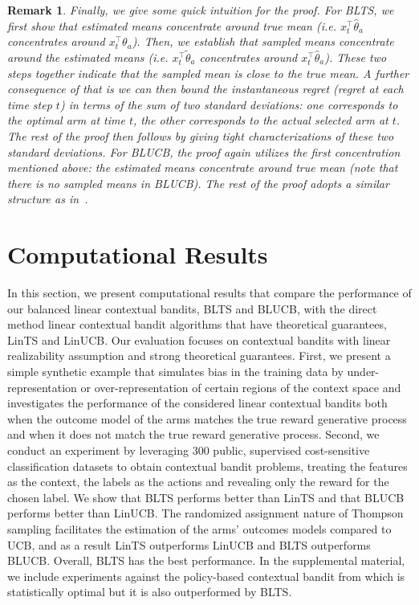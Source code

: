 \documentclass[letterpaper]{article} %
\newtheorem{remark}{Remark}
\begin{document}
\begin{remark}
Finally, we give some quick intuition for the proof. For  BLTS, we first show that estimated means concentrate around true mean (i.e. $x_t^\top \hat{\theta}_a$ concentrates around $x_t^\top \theta_a$). Then, we establish that sampled means concentrate around the estimated means (i.e. $x_t^\top\tilde{\theta}_a$  concentrates around $x_t^\top\hat{\theta}_a$). These two steps together indicate that the sampled mean is close to the true mean. A further consequence of that is we can then bound the instantaneous regret (regret at each time step $t$) in terms of the sum of two standard deviations: one corresponds to the optimal arm at time $t$, the other corresponds to the actual selected arm at $t$. The rest of the proof then follows by giving tight characterizations of these two standard deviations. For BLUCB, the proof again utilizes the first concentration mentioned above: the estimated means concentrate around true mean (note that there is no sampled means in BLUCB). The rest of the proof adopts a similar structure as in~\cite{chu2011contextual}.
\end{remark}

\section{Computational Results} 

In this section, we present computational results that compare the performance of our balanced linear contextual bandits, BLTS and BLUCB, with the direct method linear contextual bandit algorithms that have theoretical guarantees, LinTS and LinUCB.
Our evaluation focuses on contextual bandits with linear realizability assumption and strong theoretical guarantees.
First, we present a simple synthetic example that simulates bias in the training data by under-representation or over-representation of certain regions of the context space and investigates the performance of the considered linear contextual bandits both when the outcome model of the arms matches the true reward generative process and when it does not match the true reward generative process.
Second, we conduct an experiment by leveraging 300 public, supervised cost-sensitive classification datasets to obtain contextual bandit problems, treating the features as the context, the labels as the actions and revealing only the reward for the chosen label.
We show that BLTS performs better than LinTS and that BLUCB performs better than LinUCB. 
The randomized assignment nature of Thompson sampling facilitates the estimation of the arms' outcomes models compared to UCB, and as a result LinTS outperforms LinUCB and BLTS outperforms BLUCB.
Overall, BLTS has the best performance.
In the supplemental material, we include experiments against the policy-based contextual bandit from \cite{agarwal-ilovetoconbandits} which is statistically optimal but it is also outperformed by BLTS.
\end{document}
